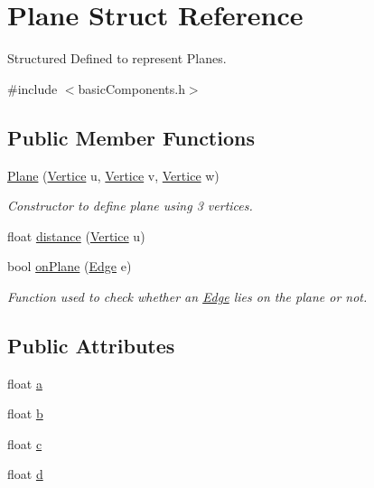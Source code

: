 \hypertarget{structPlane}{}\section{Plane Struct Reference}
\label{structPlane}


Structured Defined to represent Planes.  




{\ttfamily \#include $<$basic\+Components.\+h$>$}

\subsection*{Public Member Functions}
\begin{DoxyCompactItemize}
\item 
\hyperlink{structPlane_a96a24212b7af50908a3c62f40b9c26c9}{Plane} (\hyperlink{structVertice}{Vertice} u, \hyperlink{structVertice}{Vertice} v, \hyperlink{structVertice}{Vertice} w)
\begin{DoxyCompactList}\small\item\em Constructor to define plane using 3 vertices. \end{DoxyCompactList}\item 
float \hyperlink{structPlane_a05bbcf26965e39ed9e95a8cb41269f5c}{distance} (\hyperlink{structVertice}{Vertice} u)
\item 
bool \hyperlink{structPlane_a3a525d011cf5214cf9223976ce113876}{on\+Plane} (\hyperlink{structEdge}{Edge} e)
\begin{DoxyCompactList}\small\item\em Function used to check whether an \hyperlink{structEdge}{Edge} lies on the plane or not. \end{DoxyCompactList}\end{DoxyCompactItemize}
\subsection*{Public Attributes}
\begin{DoxyCompactItemize}
\item 
float \hyperlink{structPlane_a818b693ba813d53949e18aa1416cc12a}{a}
\item 
float \hyperlink{structPlane_a3d802fea10cfe6352e1792733d793b14}{b}
\item 
float \hyperlink{structPlane_aec04c57607ffa16c210f955360ef4153}{c}
\item 
float \hyperlink{structPlane_a61fc789fce8fbe72914f5397f1bbed44}{d}
\end{DoxyCompactItemize}


